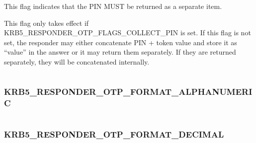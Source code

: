 \documentclass[letterpaper,10pt,english]{sphinxmanual}
\begin{document}
\begin{fulllineitems}
\label{appdev/refs/macros/KRB5_RESPONDER_OTP_FLAGS_SEPARATE_PIN:KRB5_RESPONDER_OTP_FLAGS_SEPARATE_PIN}
\end{fulllineitems}


This flag indicates that the PIN MUST be returned as a separate item.

This flag only takes effect if KRB5\_RESPONDER\_OTP\_FLAGS\_COLLECT\_PIN is set. If this flag is not set, the responder may either concatenate PIN + token value and store it as ``value'' in the answer or it may return them separately. If they are returned separately, they will be concatenated internally.

\begin{tabulary}{\linewidth}{|L|L|}
\hline

 & 
\\
\hline\end{tabulary}



\subsubsection{KRB5\_RESPONDER\_OTP\_FORMAT\_ALPHANUMERIC}
\label{appdev/refs/macros/KRB5_RESPONDER_OTP_FORMAT_ALPHANUMERIC:krb5-responder-otp-format-alphanumeric-data}\label{appdev/refs/macros/KRB5_RESPONDER_OTP_FORMAT_ALPHANUMERIC:krb5-responder-otp-format-alphanumeric}\label{appdev/refs/macros/KRB5_RESPONDER_OTP_FORMAT_ALPHANUMERIC::doc}

\begin{fulllineitems}
\label{appdev/refs/macros/KRB5_RESPONDER_OTP_FORMAT_ALPHANUMERIC:KRB5_RESPONDER_OTP_FORMAT_ALPHANUMERIC}
\end{fulllineitems}


\begin{tabulary}{\linewidth}{|L|L|}
\hline

 & 
\\
\hline\end{tabulary}



\subsubsection{KRB5\_RESPONDER\_OTP\_FORMAT\_DECIMAL}
\label{appdev/refs/macros/KRB5_RESPONDER_OTP_FORMAT_DECIMAL:krb5-responder-otp-format-decimal-data}\label{appdev/refs/macros/KRB5_RESPONDER_OTP_FORMAT_DECIMAL::doc}\label{appdev/refs/macros/KRB5_RESPONDER_OTP_FORMAT_DECIMAL:krb5-responder-otp-format-decimal}
\end{document}
